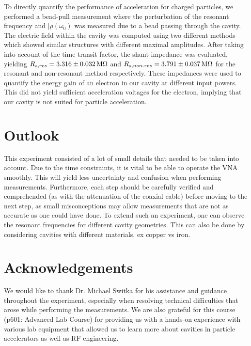 \documentclass[a4paper]{report}
\numberwithin{equation}{section}
\begin{document}
To directly quantify the performance of acceleration for charged particles, we performed a bead-pull measurement where the 
perturbation of the resonant frequency and $|\rho(\omega_0)$ was measured due to a bead passing through the cavity. The 
electric field within the cavity was computed using two different methods which showed similar structures with different 
maximal amplitudes. After taking into account of the time transit factor, the shunt impedance was evaluated, yielding
$R_{s, res} = \SI{3.316 \pm 0.032}{\mega\ohm}$ and $R_{s, non\text{-}res} = \SI{3.791 \pm 0.037}{\mega\ohm}$ for the 
resonant and non-resonant method respectively. These impedances were used to quantify the energy gain of an electron in our cavity
at different input powers. This did not yield sufficient acceleration voltages for the electron, implying that our cavity is not
suited for particle acceleration. \par 

\section{Outlook}

This experiment consisted of a lot of small details that needed to be taken into account. Due to the time constraints, it is 
vital to be able to operate the VNA smoothly. This will yield less uncertainty and confusion when performing measurements. 
Furthermore, each step should be carefully verified and comprehended (as with the attenuation of the coaxial cable) before
moving to the next step, as small misconceptions may allow measurements that are not as accurate as one could have done. 
To extend such an experiment, one can observe the resonant frequencies for different cavity geometries. This can also be done 
by considering cavities with different materials, ex copper vs iron.

\section*{Acknowledgements}

We would like to thank Dr. Michael Switka for his assistance and guidance throughout the experiment, especially when
resolving technical difficulties that arose while performing the measurements. We are also grateful for this course 
(p601: Advanced Lab Course) for providing us with a hands-on experience with various lab equipment that allowed us to 
learn more about cavities in particle accelerators as well as RF engineering. 
\end{document}
